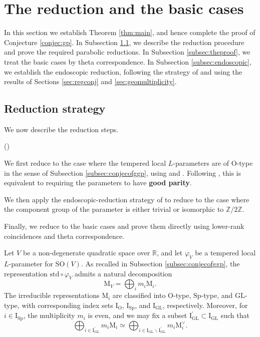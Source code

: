 \documentclass[12pt]{amsart}
\numberwithin{equation}{subsection}
\newcounter{keepeqno}
\newenvironment{num}
 {\setcounter{keepeqno}{\value{equation}}%
  \begin{list}{(\theequation)}{\usecounter{equation}}%
  \setcounter{equation}{\value{keepeqno}}}
 {\end{list}}
\newcommand{\BR}{{\mathbb {R}}}
\newcommand{\BZ}{{\mathbb {Z}}}
\newcommand{\RI}{{\mathrm {I}}}
\newcommand{\RM}{{\mathrm {M}}}
\newcommand{\RO}{{\mathrm {O}}}
\newcommand{\GL}{{\mathrm{GL}}}
\newcommand{\SO}{{\mathrm{SO}}}
\newcommand{\Sp}{{\mathrm{Sp}}}
\newcommand{\bs}{\backslash}
\def\std{\mathrm{std}}
\def\vphi{\varphi}
\def\p{\prime}
\def\SO{\mathrm{SO}}
\begin{document}
\section{The reduction and the basic cases}\label{sec:redtoendoscopypf}

In this section we establish Theorem \ref{thm:main}, and hence complete the
proof of Conjecture \ref{conjec:gp}. In Subsection \ref{subsec:steps}, we
describe the reduction procedure and prove the required parabolic reductions.
In Subsection \ref{subsec:theproof}, we treat the basic cases by theta
correspondence. In Subsection \ref{subsec:endoscopic}, we establish the
endoscopic reduction, following the strategy of \cite[Prop.~3.3]{MR3155345}
and using the results of Sections \ref{sec:regconj} and
\ref{sec:geomultiplicity}.

\subsection{Reduction strategy}\label{subsec:steps}

We now describe the reduction steps.

\begin{num}
\item\label{step:1} We first reduce to the case where the tempered local
$L$-parameters are of $\RO$-type in the sense of Subsection
\ref{subsec:conjecofggp}, using \cite[Thm.~4.4]{moeglin2020paquets} and
\cite[\S 6]{renard2024generic}. Following
\cite[\S 4.1]{moeglin2020paquets}, this is equivalent to requiring the
parameters to have \textbf{good parity}.

\item\label{step:2} We then apply the endoscopic-reduction strategy of
\cite{MR3155345} to reduce to the case where the component group of the
parameter is either trivial or isomorphic to $\BZ/2\BZ$.

\item\label{step:3} Finally, we reduce to the basic cases and prove them
directly using lower-rank coincidences and theta correspondence.
\end{num}

Let $V$ be a non-degenerate quadratic space over $\BR$, and let $\vphi_V$ be a
tempered local $L$-parameter for $\SO(V)$. As recalled in Subsection
\ref{subsec:conjecofggp}, the representation $\std\circ \vphi_V$ admits a
natural decomposition
\[
\RM_V=\bigoplus_i m_i\RM_i.
\]
The irreducible representations $\RM_i$ are classified into $\RO$-type,
$\Sp$-type, and $\GL$-type, with corresponding index sets $\RI_{\RO}$,
$\RI_\Sp$, and $\RI_{\GL}$, respectively. Moreover, for $i\in \RI_{\Sp}$, the
multiplicity $m_i$ is even, and we may fix a subset
$\RI^\p_\GL\subset \RI_{\GL}$ such that
\[
\bigoplus_{i\in \RI^\p_\GL}m_i\RM_i \simeq \bigoplus_{i\in \RI_{\GL}\bs \RI_{\GL}^\p}m_i\RM^\vee_i.
\]
\end{document}
